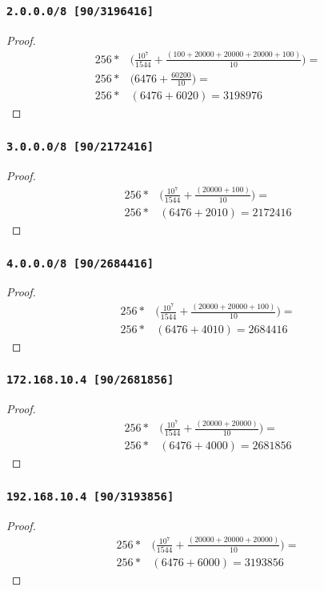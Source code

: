 \documentclass[12pt, times]{simauth}
\begin{document}
\begin{minipage}[t]{0.45\linewidth}
\subsubsection{\texttt{2.0.0.0/8 [90/3196416]}}
\begin{proof}
    \begin{align*}
        256 *& \bigg(\frac{10^7}{1544} + \frac{(100 + 20000 + 20000 + 20000 + 100)}{10}\bigg) = \\
        256 *& \bigg(6476 + \frac{60200}{10} \bigg) = \\
        256 *& (6476 + 6020) = 3198976
    \end{align*}
\end{proof}
\subsubsection{\texttt{3.0.0.0/8 [90/2172416]}}
\begin{proof}
\begin{align*}
256 *& \bigg(\frac{10^7}{1544} + \frac{(20000 + 100)}{10}\bigg) = \\
256 *& (6476 + 2010) = 2172416
\end{align*}
\end{proof}
\subsubsection{\texttt{4.0.0.0/8 [90/2684416]}}
\begin{proof}
    \begin{align*}
        256 *& \bigg(\frac{10^7}{1544} + \frac{(20000 + 20000 + 100)}{10}\bigg) = \\
        256 *& (6476 + 4010) = 2684416
    \end{align*}
\end{proof}
\end{minipage} \hfill
\begin{minipage}[t]{0.45\linewidth}  
\subsubsection{\texttt{172.168.10.4 [90/2681856]}}
\begin{proof}
    \begin{align*}
        256 *& \bigg(\frac{10^7}{1544} + \frac{(20000 + 20000)}{10}\bigg) = \\
        256 *& (6476 + 4000) = 2681856
    \end{align*}
\end{proof}
\subsubsection{\texttt{192.168.10.4 [90/3193856]}}
\begin{proof}
\begin{align*}
256 *& \bigg(\frac{10^7}{1544} + \frac{(20000 + 20000 + 20000)}{10}\bigg) = \\
256 *& (6476 + 6000) = 3193856
\end{align*}
\end{proof}
\end{minipage}
\end{document}
